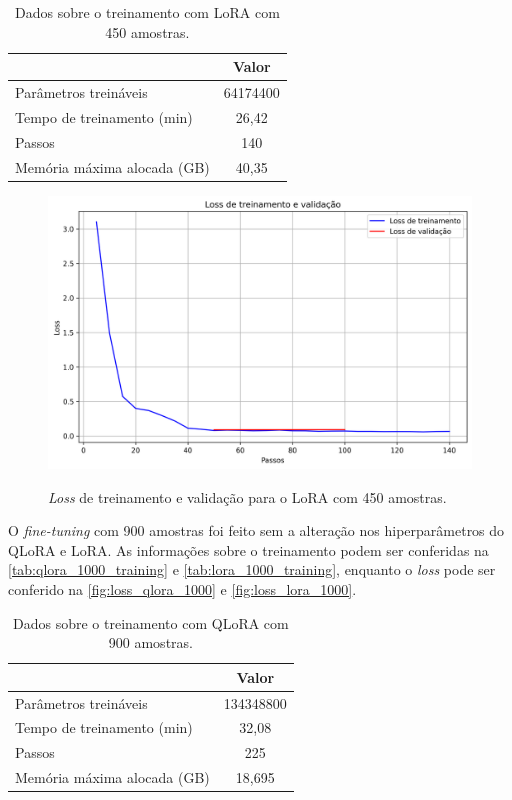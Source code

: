 \begin{table}[ht]
    \caption{\small Dados sobre o treinamento com \ac{LoRA} com 450 amostras.}
    \centering
    \begin{tabular}{l|c}
        \hline
                                    & Valor    \\ \hline
        Parâmetros treináveis       & 64174400 \\
        Tempo de treinamento (min)  & 26,42    \\
        Passos                      & 140      \\
        Memória máxima alocada (GB) & 40,35    \\ \hline
    \end{tabular}
    \label{tab:lora_500_training}
\end{table}

\clearpage

\begin{figure}[ht]
    \centering
    \caption{\small \textit{Loss} de treinamento e validação para o \ac{LoRA} com 450 amostras.}
    \includegraphics[width=0.725\columnwidth,keepaspectratio]{images/loss_lora_500.png}
    \label{fig:loss_lora_500}
\end{figure}

O \textit{fine-tuning} com 900 amostras foi feito sem a alteração nos hiperparâmetros do \ac{QLoRA} e \ac{LoRA}. As informações sobre o treinamento podem ser conferidas
na \autoref{tab:qlora_1000_training} e \autoref{tab:lora_1000_training}, enquanto o \textit{loss} pode ser conferido na \autoref{fig:loss_qlora_1000} e
\autoref{fig:loss_lora_1000}.

\begin{table}[ht]
    \caption{\small Dados sobre o treinamento com \ac{QLoRA} com 900 amostras.}
    \centering
    \begin{tabular}{l|c}
        \hline
                                    & Valor     \\ \hline
        Parâmetros treináveis       & 134348800 \\
        Tempo de treinamento (min)  & 32,08     \\
        Passos                      & 225       \\
        Memória máxima alocada (GB) & 18,695    \\ \hline
    \end{tabular}
    \label{tab:qlora_1000_training}
\end{table}

